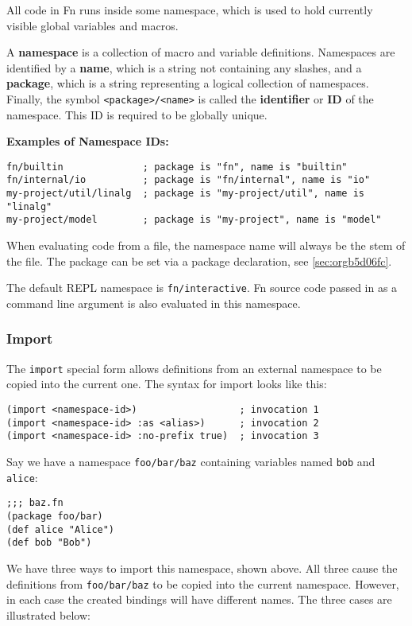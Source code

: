 \documentclass[11pt]{article}
\begin{document}
All code in Fn runs inside some namespace, which is used to hold currently
visible global variables and macros.

A \textbf{namespace} is a collection of macro and variable definitions. Namespaces are
identified by a \textbf{name}, which is a string not containing any slashes, and a
\textbf{package}, which is a string representing a logical collection of namespaces.
Finally, the symbol \texttt{<package>/<name>} is called the \textbf{identifier} or \textbf{ID} of the
namespace. This ID is required to be globally unique.

\textbf{Examples of Namespace IDs:}
\begin{verbatim}
fn/builtin              ; package is "fn", name is "builtin"
fn/internal/io          ; package is "fn/internal", name is "io"
my-project/util/linalg  ; package is "my-project/util", name is "linalg"
my-project/model        ; package is "my-project", name is "model"
\end{verbatim}

When evaluating code from a file, the namespace name will always be the stem of
the file. The package can be set via a package declaration, see \ref{sec:orgb5d06fc}.

The default REPL namespace is \texttt{fn/interactive}. Fn source code passed in as a
command line argument is also evaluated in this namespace.


\subsubsection{Import}
\label{sec:org85057e2}

The \texttt{import} special form allows definitions from an external namespace to be
copied into the current one. The syntax for import looks like this:

\begin{verbatim}
(import <namespace-id>)                  ; invocation 1
(import <namespace-id> :as <alias>)      ; invocation 2
(import <namespace-id> :no-prefix true)  ; invocation 3
\end{verbatim}

Say we have a namespace \texttt{foo/bar/baz} containing variables named \texttt{bob} and
\texttt{alice}:
\begin{verbatim}
;;; baz.fn
(package foo/bar)
(def alice "Alice")
(def bob "Bob")
\end{verbatim}

We have three ways to import this namespace, shown above. All three cause the
definitions from \texttt{foo/bar/baz} to be copied into the current namespace. However,
in each case the created bindings will have different names. The three cases are
illustrated below:
\end{document}
